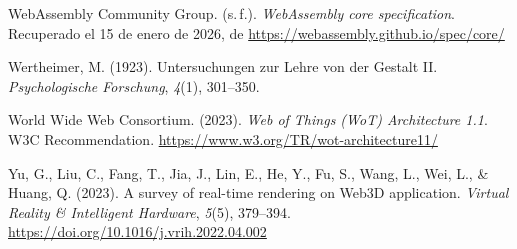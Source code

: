 \begin{list}{}
\item WebAssembly Community Group. (s.\,f.). \textit{WebAssembly core specification}. Recuperado el 15 de enero de 2026, de \url{https://webassembly.github.io/spec/core/}

\item Wertheimer, M. (1923). Untersuchungen zur Lehre von der Gestalt II. \textit{Psychologische Forschung}, \textit{4}(1), 301--350.

\item World Wide Web Consortium. (2023). \textit{Web of Things (WoT) Architecture 1.1}. W3C Recommendation. \url{https://www.w3.org/TR/wot-architecture11/}

\item Yu, G., Liu, C., Fang, T., Jia, J., Lin, E., He, Y., Fu, S., Wang, L., Wei, L., \& Huang, Q. (2023). A survey of real-time rendering on Web3D application. \textit{Virtual Reality \& Intelligent Hardware}, \textit{5}(5), 379--394. \url{https://doi.org/10.1016/j.vrih.2022.04.002}

\end{list}
